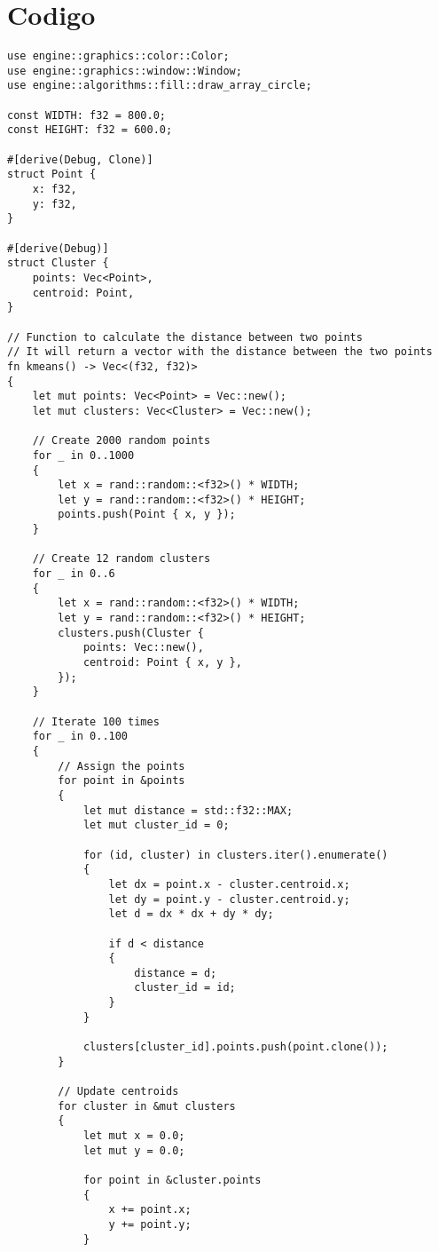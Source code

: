 \documentclass{article}
\begin{document}
\section{Codigo}
\begin{verbatim}
use engine::graphics::color::Color;
use engine::graphics::window::Window;
use engine::algorithms::fill::draw_array_circle;

const WIDTH: f32 = 800.0;
const HEIGHT: f32 = 600.0;

#[derive(Debug, Clone)]
struct Point {
    x: f32,
    y: f32,
}

#[derive(Debug)]
struct Cluster {
    points: Vec<Point>,
    centroid: Point,
}

// Function to calculate the distance between two points
// It will return a vector with the distance between the two points
fn kmeans() -> Vec<(f32, f32)>
{
    let mut points: Vec<Point> = Vec::new();
    let mut clusters: Vec<Cluster> = Vec::new();

    // Create 2000 random points
    for _ in 0..1000
    {
        let x = rand::random::<f32>() * WIDTH;
        let y = rand::random::<f32>() * HEIGHT;
        points.push(Point { x, y });
    }

    // Create 12 random clusters
    for _ in 0..6
    {
        let x = rand::random::<f32>() * WIDTH;
        let y = rand::random::<f32>() * HEIGHT;
        clusters.push(Cluster {
            points: Vec::new(),
            centroid: Point { x, y },
        });
    }

    // Iterate 100 times
    for _ in 0..100
    {
        // Assign the points
        for point in &points
        {
            let mut distance = std::f32::MAX;
            let mut cluster_id = 0;

            for (id, cluster) in clusters.iter().enumerate()
            {
                let dx = point.x - cluster.centroid.x;
                let dy = point.y - cluster.centroid.y;
                let d = dx * dx + dy * dy;

                if d < distance
                {
                    distance = d;
                    cluster_id = id;
                }
            }

            clusters[cluster_id].points.push(point.clone());
        }

        // Update centroids
        for cluster in &mut clusters
        {
            let mut x = 0.0;
            let mut y = 0.0;

            for point in &cluster.points
            {
                x += point.x;
                y += point.y;
            }


\end{verbatim}
\end{document}
